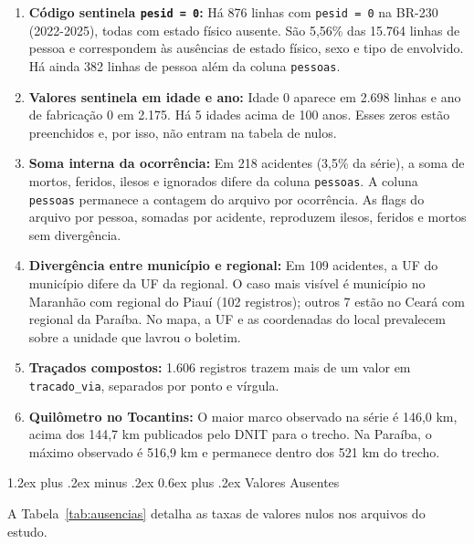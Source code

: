 \documentclass[11pt,a4paper]{article}
\makeatletter
\renewcommand\subsection{
\@startsection{subsection}{2}{0pt}%
{1.2ex plus .2ex minus .2ex}%
{0.6ex plus .2ex}%
{\normalfont\large\bfseries\color{secondary}}
}
\makeatother
\begin{document}
\begin{enumerate}
    \item \textbf{Código sentinela \texttt{pesid = 0}:} Há 876 linhas com \texttt{pesid = 0} na BR-230 (2022-2025), todas com estado físico ausente. São 5,56\% das 15.764 linhas de pessoa e correspondem às ausências de estado físico, sexo e tipo de envolvido. Há ainda 382 linhas de pessoa além da coluna \texttt{pessoas}.
    \item \textbf{Valores sentinela em idade e ano:} Idade 0 aparece em 2.698 linhas e ano de fabricação 0 em 2.175. Há 5 idades acima de 100 anos. Esses zeros estão preenchidos e, por isso, não entram na tabela de nulos.
    \item \textbf{Soma interna da ocorrência:} Em 218 acidentes (3,5\% da série), a soma de mortos, feridos, ilesos e ignorados difere da coluna \texttt{pessoas}. A coluna \texttt{pessoas} permanece a contagem do arquivo por ocorrência. As flags do arquivo por pessoa, somadas por acidente, reproduzem ilesos, feridos e mortos sem divergência.
    \item \textbf{Divergência entre município e regional:} Em 109 acidentes, a UF do município difere da UF da regional. O caso mais visível é município no Maranhão com regional do Piauí (102 registros); outros 7 estão no Ceará com regional da Paraíba. No mapa, a UF e as coordenadas do local prevalecem sobre a unidade que lavrou o boletim.
    \item \textbf{Traçados compostos:} 1.606 registros trazem mais de um valor em \texttt{tracado\_via}, separados por ponto e vírgula.
    \item \textbf{Quilômetro no Tocantins:} O maior marco observado na série é 146,0 km, acima dos 144,7 km publicados pelo DNIT para o trecho. Na Paraíba, o máximo observado é 516,9 km e permanece dentro dos 521 km do trecho.
\end{enumerate}

\subsection{Valores Ausentes}

A Tabela~\ref{tab:ausencias} detalha as taxas de valores nulos nos arquivos do estudo.
\end{document}
